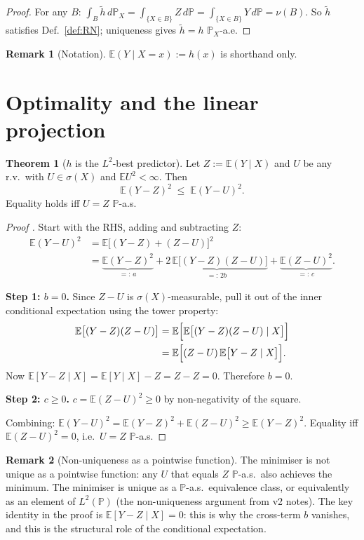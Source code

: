 \documentclass[12pt, a4paper]{article}
\theoremstyle{definition}
\newtheorem{theorem}{Theorem}[section]
\newtheorem{remark}{Remark}[section]
\newcommand{\E}{\mathbb{E}}
\newcommand{\Prob}{\mathbb{P}}
\begin{document}
\begin{proof}
For any $B$: $\int_B\tilde h\,d\Prob_X
=\int_{\{X\in B\}}Z\,d\Prob
=\int_{\{X\in B\}}Y\,d\Prob=\nu(B)$.
So $\tilde h$ satisfies Def.~\ref{def:RN}; uniqueness gives
$\tilde h=h$ $\Prob_X$-a.e.
\end{proof}

\begin{remark}[Notation]
$\E(Y\mid X=x):=h(x)$ is shorthand only.
\end{remark}

\section{Optimality and the linear projection}

\begin{theorem}[$h$ is the $L^2$-best predictor]\label{thm:l2opt}
Let $Z:=\E(Y\mid X)$ and $U$ be any r.v.\ with
$U\in\sigma(X)$ and $\E U^2<\infty$.  Then
\[
  \E(Y-Z)^2 \;\leq\; \E(Y-U)^2.
\]
Equality holds iff $U=Z$ $\Prob$-a.s.
\end{theorem}

\begin{proof}[Proof ]
Start with the RHS, adding and subtracting $Z$:
\begin{align*}
  \E(Y-U)^2
  &= \E\bigl[(Y-Z)+(Z-U)\bigr]^2 \\
  &= \underbrace{\E(Y-Z)^2}_{=:\,a}
   + \underbrace{2\,\E\bigl[(Y-Z)(Z-U)\bigr]}_{=:\,2b}
   + \underbrace{\E(Z-U)^2}_{=:\,c}.
\end{align*}

\textbf{Step 1: $b=0$.}
Since $Z-U$ is $\sigma(X)$-measurable, pull it out of the
inner conditional expectation using the tower property:
\begin{align*}
  \E\bigl[(Y-Z)(Z-U)\bigr]
  &= \E\Bigl[\E\bigl[(Y-Z)(Z-U)\mid X\bigr]\Bigr] \\
  &= \E\Bigl[(Z-U)\,\E\bigl[Y-Z\mid X\bigr]\Bigr].
\end{align*}
Now $\E[Y-Z\mid X]=\E[Y\mid X]-Z=Z-Z=0$.
Therefore $b=0$.

\textbf{Step 2: $c\geq 0$.}
$c=\E(Z-U)^2\geq 0$ by non-negativity of the square.

Combining: $\E(Y-U)^2=\E(Y-Z)^2+\E(Z-U)^2\geq\E(Y-Z)^2$.
Equality iff $\E(Z-U)^2=0$, i.e.\ $U=Z$ $\Prob$-a.s.
\end{proof}

\begin{remark}[Non-uniqueness as a pointwise function]
The minimiser is not unique as a pointwise function: any
$U$ that equals $Z$ $\Prob$-a.s.\ also achieves the minimum.
The minimiser is unique as a $\Prob$-a.s.\ equivalence class,
or equivalently as an element of $L^2(\Prob)$ (the non-uniqueness argument
from v2 notes).
The key identity in the proof is $\E[Y-Z\mid X]=0$:
this is why the cross-term $b$ vanishes, and this is the
structural role of the conditional expectation.
\end{remark}
\end{document}
